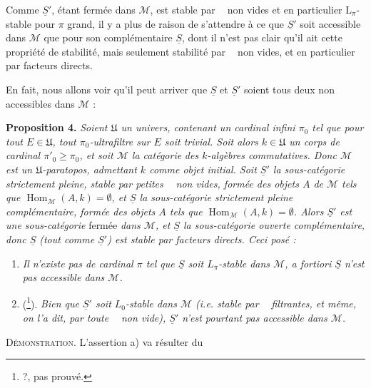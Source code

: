 \documentclass[11pt]{article}
\newcommand{\printedpage}[1]{\marginpar{\footnotesize p.~#1}}
\newcommand{\msp}[1]{\marginpar{\footnotesize [#1]}}
\newcommand{\limind}{\mathop{\underrightarrow{\mathrm{lim}}}}
\newcommand{\limproj}{\mathop{\underleftarrow{\mathrm{lim}}}}
\begin{document}
Comme $\underline{S}'$, étant fermée dans $\mathcal{M}$, est stable par $\limind$ non vides et en particulier $\mathrm{L}_\pi$-stable pour $\pi$ grand, il y a plus de raison de s'attendre à ce que $\underline{S}'$ soit accessible dans $\mathcal{M}$ que pour son complémentaire $\underline{S}$, dont il n'est pas clair qu'il ait cette propriété de stabilité, mais seulement stabilité par $\limproj$ non vides, et en particulier par facteurs directs.

En fait, nous allons voir qu'il peut arriver que $\underline{S}$ et $\underline{S}'$ soient tous deux non accessibles dans $\mathcal{M}$ :

\textbf{Proposition 4.} \textit{Soient $\mathfrak{U}$ un univers, contenant un cardinal infini $\pi_0$ tel que pour tout $E\in\mathfrak{U}$, tout $\pi_0$-ultrafiltre sur $E$ soit trivial. Soit alors $k\in\mathfrak{U}$ un corps de cardinal $\pi'_0\geqslant\pi_0$, et soit $\mathcal{M}$ la catégorie}
\printedpage{197}
\msp{page 14}
\textit{des $k$-algèbres commutatives. Donc $\mathcal{M}$ est un $\mathfrak{U}$-paratopos, admettant $k$ comme objet initial. Soit $\underline{S}'$ la sous-catégorie strictement pleine, stable par petites $\limind$ non vides, formée des objets $A$ de $\mathcal{M}$ tels que $\operatorname{Hom}_{\mathcal{M}}(A,k)=\emptyset$, et $\underline{S}$ la sous-catégorie strictement pleine complémentaire, formée des objets $A$ tels que $\operatorname{Hom}_{\mathcal{M}}(A,k)=\emptyset$. Alors $\underline{S}'$ est une sous-catégorie} fermée \textit{dans $\mathcal{M}$, et $\underline{S}$ la sous-catégorie ouverte complémentaire, donc $\underline{S}$ (tout comme $\underline{S}'$) est stable par facteurs directs. Ceci posé :} %
\begin{enumerate}[label={}]
\item[\textit{a)}] \textit{Il n'existe pas de cardinal $\pi$ tel que $\underline{S}$ soit $L_\pi$-stable dans $\mathcal{M}$, a fortiori $\underline{S}$ n'est pas accessible dans $\mathcal{M}$.}
\item[\textit{b)}] (\footnote[207]{?, pas prouvé.}). \textit{Bien que $\underline{S}'$ soit $L_0$-stable dans $\mathcal{M}$ (i.e. stable par $\limind$ filtrantes, et même, on l'a dit, par toute $\limind$ non vide), $\underline{S}'$ n'est pourtant pas accessible dans $\mathcal{M}$.}
\end{enumerate}
\noindent\textsc{Démonstration}. L'assertion a) va résulter du
\end{document}
